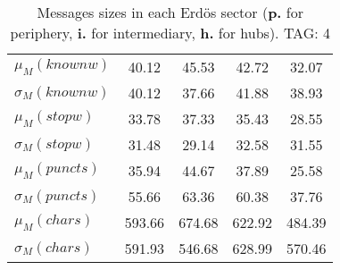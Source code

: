 \begin{table}[h!]
\begin{center}
\begin{tabular}{| l || c | c | c | c |}
$\mu_M(knownw)$ & 40.12  & 45.53  & 42.72  & 32.07 \\
$\sigma_M(knownw)$ & 40.12  & 37.66  & 41.88  & 38.93 \\\hline
$\mu_M(stopw)$ & 33.78  & 37.33  & 35.43  & 28.55 \\
$\sigma_M(stopw)$ & 31.48  & 29.14  & 32.58  & 31.55 \\\hline
$\mu_M(puncts)$ & 35.94  & 44.67  & 37.89  & 25.58 \\
$\sigma_M(puncts)$ & 55.66  & 63.36  & 60.38  & 37.76 \\\hline
$\mu_M(chars)$ & 593.66  & 674.68  & 622.92  & 484.39 \\
$\sigma_M(chars)$ & 591.93  & 546.68  & 628.99  & 570.46 \\\hline
\end{tabular}
\caption{Messages sizes in each Erd\"os sector ({{\bf p.}} for periphery, {{\bf i.}} for intermediary, {{\bf h.}} for hubs). TAG: 4}
\end{center}
\end{table}